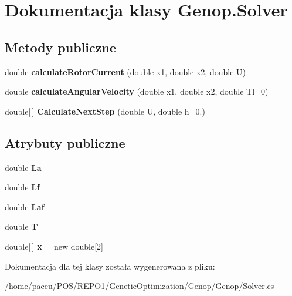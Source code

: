 \hypertarget{classGenop_1_1Solver}{}\section{Dokumentacja klasy Genop.\+Solver}
\label{classGenop_1_1Solver}
\subsection*{Metody publiczne}
\begin{DoxyCompactItemize}
\item 
double {\bfseries calculate\+Rotor\+Current} (double x1, double x2, double U)\hypertarget{classGenop_1_1Solver_a284e2f18385857212e8a2cc38f14c155}{}\label{classGenop_1_1Solver_a284e2f18385857212e8a2cc38f14c155}

\item 
double {\bfseries calculate\+Angular\+Velocity} (double x1, double x2, double Tl=0)\hypertarget{classGenop_1_1Solver_ac40d9b2668f551bfc3c4e2b5f054012a}{}\label{classGenop_1_1Solver_ac40d9b2668f551bfc3c4e2b5f054012a}

\item 
double\mbox{[}$\,$\mbox{]} {\bfseries Calculate\+Next\+Step} (double U, double h=0.)\hypertarget{classGenop_1_1Solver_ad03d8a897aa8db437cc46b54872e021d}{}\label{classGenop_1_1Solver_ad03d8a897aa8db437cc46b54872e021d}

\end{DoxyCompactItemize}
\subsection*{Atrybuty publiczne}
\begin{DoxyCompactItemize}
\item 
double {\bfseries La}\hypertarget{classGenop_1_1Solver_a6d1c056f0852c4ff60804fb5ffee2bcc}{}\label{classGenop_1_1Solver_a6d1c056f0852c4ff60804fb5ffee2bcc}

\item 
double {\bfseries Lf}\hypertarget{classGenop_1_1Solver_a8f9b37a235ba4f5d508ed939ca920a6d}{}\label{classGenop_1_1Solver_a8f9b37a235ba4f5d508ed939ca920a6d}

\item 
double {\bfseries Laf}\hypertarget{classGenop_1_1Solver_a94d64291faa7206ef19499dc468afc5e}{}\label{classGenop_1_1Solver_a94d64291faa7206ef19499dc468afc5e}

\item 
double {\bfseries T}\hypertarget{classGenop_1_1Solver_a4b843e4fbca0a421ece8fffb4f59236f}{}\label{classGenop_1_1Solver_a4b843e4fbca0a421ece8fffb4f59236f}

\item 
double\mbox{[}$\,$\mbox{]} {\bfseries x} = new double\mbox{[}2\mbox{]}\hypertarget{classGenop_1_1Solver_ac15052491c6a89063cf8c6b679552c3b}{}\label{classGenop_1_1Solver_ac15052491c6a89063cf8c6b679552c3b}

\end{DoxyCompactItemize}


Dokumentacja dla tej klasy została wygenerowana z pliku\+:\begin{DoxyCompactItemize}
\item 
/home/paceu/\+P\+O\+S/\+R\+E\+P\+O1/\+Genetic\+Optimization/\+Genop/\+Genop/Solver.\+cs\end{DoxyCompactItemize}
